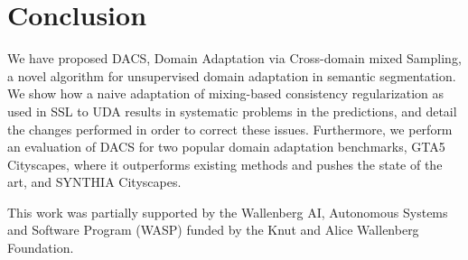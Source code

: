 \documentclass[10pt,twocolumn,letterpaper]{article}
\begin{document}
\section{Conclusion}
We have proposed DACS, Domain Adaptation via Cross-domain mixed Sampling, a novel algorithm for unsupervised domain adaptation in semantic segmentation. We show how a naive adaptation of mixing-based consistency regularization as used in SSL to UDA results in systematic problems in the predictions, and detail the changes performed in order to correct these issues. Furthermore, we perform an evaluation of DACS for two popular domain adaptation benchmarks, GTA5  Cityscapes, where it outperforms existing methods and pushes the state of the art, and SYNTHIA  Cityscapes.

\vspace{0.4cm}
 This work was partially supported by the Wallenberg AI, Autonomous Systems and Software Program (WASP) funded by the Knut and Alice Wallenberg Foundation.






{\small


}
\end{document}

